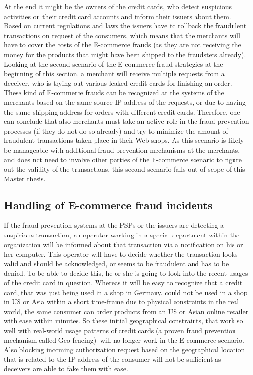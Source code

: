 At the end it might be the owners of the credit cards, who detect suspicious activities on their credit card accounts and inform their issuers about them. Based on current regulations and laws the issuers have to rollback the fraudulent transactions on request of the consumers, which means that the merchants will have to cover the costs of the \gls{E-commerce} frauds (as they are not receiving the money for the products that might have been shipped to the fraudsters already). \\

Looking at the second scenario of the \gls{E-commerce} fraud strategies at the beginning of this section, a merchant will receive multiple requests from a deceiver, who is trying out various leaked credit cards for finishing an order. These kind of \gls{E-commerce} frauds can be recognized at the systems of the merchants based on the same source \gls{IP} address of the requests, or due to having the same shipping address for orders with different credit cards. Therefore, one can conclude that also merchants must take an active role in the fraud prevention processes (if they do not do so already) and try to minimize the amount of fraudulent transactions taken place in their Web shops. As this scenario is likely be manageable with additional fraud prevention mechanisms at the merchants, and does not need to involve other parties of the \gls{E-commerce} scenario to figure out the validity of the transactions, this second scenario falls out of scope of this Master thesis.


\subsection{Handling of E-commerce fraud incidents}
\label{subsec:e_commerce_fraud_handling}

If the fraud prevention systems at the \gls{PSP}s or the issuers are detecting a suspicious transaction, an operator working in a special department within the organization will be informed about that transaction via a notification on his or her computer. This operator will have to decide whether the transaction looks valid and should be acknowledged, or seems to be fraudulent and has to be denied. To be able to decide this, he or she is going to look into the recent usages of the credit card in question. Whereas it will be easy to recognize that a credit card, that was just being used in a shop in Germany, could not be used in a shop in US or Asia within a short time-frame due to physical constraints in the real world, the same consumer can order products from an US or Asian online retailer with ease within minutes. So these initial geographical constraints, that work so well with real-world usage patterns of credit cards (a proven fraud prevention mechanism called Geo-fencing), will no longer work in the \gls{E-commerce} scenario. Also blocking incoming authorization request based on the geographical location that is related to the \gls{IP} address of the consumer will not be sufficient as deceivers are able to fake them with ease. \\


